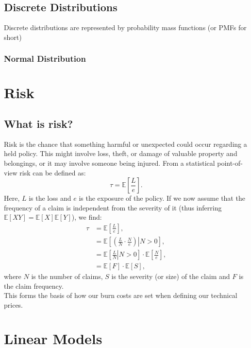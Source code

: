 \documentclass{article}
\begin{document}
\subsection{Discrete Distributions}
Discrete distributions are represented by probability mass functions (or PMFs for short)





\subsubsection{Normal Distribution}



\section{Risk}
\subsection{What is risk?}
Risk is the chance that something harmful or unexpected could occur regarding a held policy. This might involve loss, theft, or damage of valuable property and belongings, or it may involve someone being injured. From a statistical point-of-view risk can be defined as:
\begin{equation}
    \tau = \mathbb{E}\left[\frac{L}{e}\right].
\end{equation}
Here, $L$ is the loss and $e$ is the exposure of the policy. If we now assume that the frequency of a claim is independent from the severity of it (thus inferring $\mathbb{E}[XY] = \mathbb{E}[X]\mathbb{E}[Y]$), we find:
\begin{align}
    \tau &= \mathbb{E}\left[\frac{L}{e}\right], \\
    &= \mathbb{E}\left[ \left. \left( \frac{L}{N} \cdot\frac{N}{e} \right) \right\vert N>0 \right], \\
    &= \mathbb{E}\left[\left.\frac{L}{N}\right\vert N>0\right]\cdot\mathbb{E}\left[\frac{N}{e}\right], \\
    &= \mathbb{E}[F]\cdot\mathbb{E}[S],
\end{align}
where $N$ is the number of claims, $S$ is the severity (or size) of the claim and $F$ is the claim frequency.\\
This forms the basis of how our burn costs are set when defining our technical prices.

\section{Linear Models}
\end{document}

